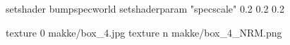setshader bumpspecworld
setshaderparam "specscale" 0.2 0.2 0.2

texture 0 makke/box_4.jpg
texture n makke/box_4_NRM.png
